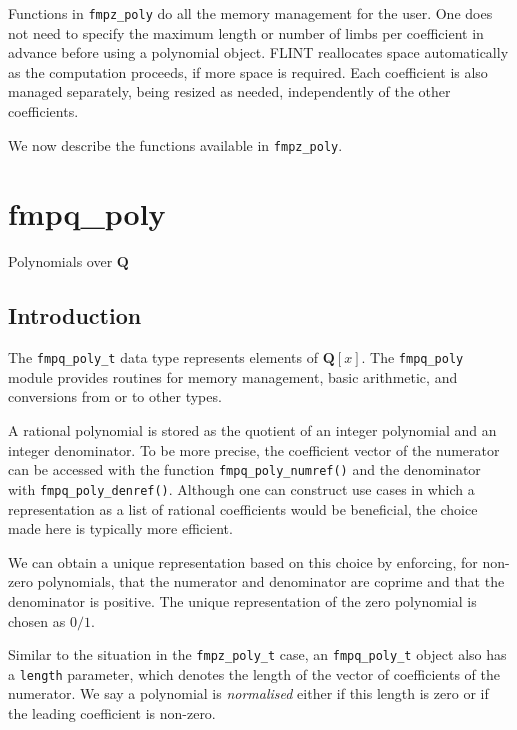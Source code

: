 \documentclass[a4paper,10pt]{book}
\newcommand{\Q}{\mathbf{Q}}%
\newcommand{\code}{\lstinline}
\begin{document}
Functions in \code{fmpz_poly} do all the memory management for the user. 
One does not need to specify the maximum length or number of limbs per 
coefficient in advance before using a polynomial object.  FLINT reallocates 
space automatically as the computation proceeds, if more space is required. 
Each coefficient is also managed separately, being resized as needed, 
independently of the other coefficients.

We now describe the functions available in \code{fmpz_poly}.




\chapter{fmpq\_poly}
\epigraph{Polynomials over $\Q$}{}

\section{Introduction}

The \code{fmpq_poly_t} data type represents elements of $\Q[x]$. The 
\code{fmpq_poly} module provides routines for memory management, basic 
arithmetic, and conversions from or to other types.

A rational polynomial is stored as the quotient of an integer polynomial 
and an integer denominator.  To be more precise, the coefficient vector 
of the numerator can be accessed with the function \code{fmpq_poly_numref()} 
and the denominator with \code{fmpq_poly_denref()}.  Although one can 
construct use cases in which a representation as a list of rational 
coefficients would be beneficial, the choice made here is typically 
more efficient.

We can obtain a unique representation based on this choice by enforcing, 
for non-zero polynomials, that the numerator and denominator are coprime 
and that the denominator is positive.  The unique representation of the 
zero polynomial is chosen as $0/1$.

Similar to the situation in the \code{fmpz_poly_t} case, an 
\code{fmpq_poly_t} object also has a \code{length} parameter, which 
denotes the length of the vector of coefficients of the numerator. 
We say a polynomial is \emph{normalised} either if this length is zero 
or if the leading coefficient is non-zero.
\end{document}
